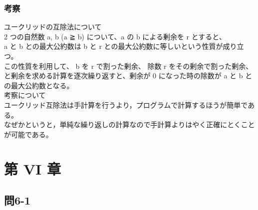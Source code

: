 \documentclass{jarticle}
\begin{document}
\subsubsection{考察\\}
ユークリッドの互除法について\\
2 つの自然数 a, b (a ≧ b) について、a の b による剰余を r とすると、\\ 
a と b との最大公約数は b と r との最大公約数に等しいという性質が成り立つ。\\
この性質を利用して、 b を r で割った剰余、 除数 r をその剰余で割った剰余、\\
と剰余を求める計算を逐次繰り返すと、剰余が 0 になった時の除数が a と b との最大公約数となる。\\
考察について\\
ユークリッド互除法は手計算を行うより，プログラムで計算するほうが簡単である。\\
なぜかというと，単純な繰り返しの計算なので手計算よりはやく正確にとくことが可能である。\\


\section{第 VI 章\\}
\subsection{問6-1\\}
\end{document}
